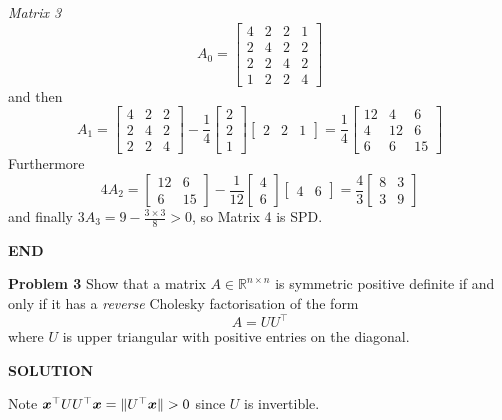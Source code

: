 \documentclass[12pt,a4paper]{article}
\def\bbR{ {\mathbb R} }
\def\x{ {\vc x} }
\begin{document}
\emph{Matrix 3}
\[
A_0=\begin{bmatrix}
4 & 2 & 2 & 1 \\
2 & 4 & 2 & 2 \\
2 & 2 & 4 & 2 \\
1 & 2 & 2 & 4
\end{bmatrix}
\]
and then
\[
A_1=\begin{bmatrix}
4&2&2\\
2&4&2\\
2&2&4
\end{bmatrix}-\frac{1}{4}\begin{bmatrix} 2 \\ 2 \\ 1 \end{bmatrix}\begin{bmatrix} 2 & 2 & 1 \end{bmatrix}=\frac{1}{4}
\begin{bmatrix}
12&4&6\\
4&12&6\\
6&6&15
\end{bmatrix}
\]
Furthermore
\[
4A_2=\begin{bmatrix}
12&6\\
6&15
\end{bmatrix}-\frac{1}{12}\begin{bmatrix} 4 \\ 6 \end{bmatrix}\begin{bmatrix} 4 & 6 \end{bmatrix}=\frac{4}{3}
\begin{bmatrix}
8&3\\
3&9
\end{bmatrix}
\]
and finally $3A_3=9-\frac{3\ensuremath{\times} 3}{8}>0$, so Matrix 4 is SPD.

\textbf{END}

\textbf{Problem 3} Show that a matrix $A \ensuremath{\in} \ensuremath{\bbR}^{n \ensuremath{\times} n}$ is symmetric positive definite if and only if it has a \emph{reverse} Cholesky factorisation of the form
\[
A = U U^\ensuremath{\top}
\]
where $U$ is upper triangular with positive entries on the diagonal.

\textbf{SOLUTION}

Note $\ensuremath{\bm{\x}}^\ensuremath{\top} U U^\ensuremath{\top} \ensuremath{\bm{\x}} = \| U^\ensuremath{\top} \ensuremath{\bm{\x}} \| > 0$ since $U$ is invertible.
\end{document}
